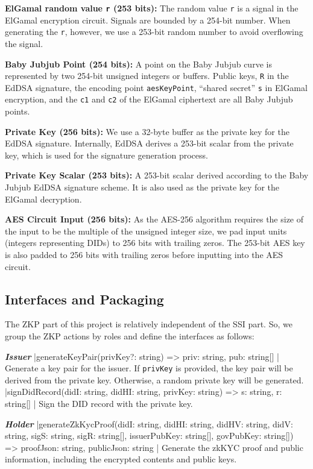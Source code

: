 \documentclass[
]{report}
\begin{document}
\textbf{ElGamal random value \texttt{r} (253 bits):} The random
value \texttt{r} is a signal in the ElGamal encryption circuit. Signals
are bounded by a 254-bit number. When generating the \texttt{r},
however, we use a 253-bit random number to avoid overflowing the signal.

\textbf{Baby Jubjub Point (254 bits):} A point on the Baby Jubjub
curve is represented by two 254-bit unsigned integers or buffers. Public
keys, \texttt{R} in the EdDSA signature, the encoding point
\texttt{aesKeyPoint}, ``shared secret'' \texttt{s} in ElGamal
encryption, and the \texttt{c1} and \texttt{c2} of the ElGamal
ciphertext are all Baby Jubjub points.

\textbf{Private Key (256 bits):} We use a 32-byte buffer as the
private key for the EdDSA signature. Internally, EdDSA derives a 253-bit
scalar from the private key, which is used for the signature generation
process.

\textbf{Private Key Scalar (253 bits):} A 253-bit scalar derived
according to the Baby Jubjub EdDSA signature scheme. It is also used as
the private key for the ElGamal decryption.

\textbf{AES Circuit Input (256 bits):} As the AES-256 algorithm
requires the size of the input to be the multiple of the unsigned
integer size, we pad input units (integers representing DIDs) to 256
bits with trailing zeros. The 253-bit AES key is also padded to 256 bits
with trailing zeros before inputting into the AES circuit.

\subsection{Interfaces and Packaging}

The ZKP part of this project is relatively independent of the SSI part.
So, we group the ZKP actions by roles and define the interfaces as
follows:

\textit{\textbf{Issuer}}
|generateKeyPair(privKey?: string) => { priv: string, pub: string[] }|
Generate a key pair for the issuer. If \texttt{privKey} is provided,
the key pair will be derived from the private key. Otherwise, a random
private key will be generated.
|signDidRecord(didI: string, didHI: string, privKey: string) => { s: string, r: string[] }|
Sign the DID record with the private key.

\textit{\textbf{Holder}}
|generateZkKycProof(didI: string, didHI: string, didHV: string, didV: string, sigS: string, sigR: string[], issuerPubKey: string{[}{]}, govPubKey: string{[}{]}) => { proofJson: string, publicJson: string }|
Generate the zkKYC proof and public information, including the
encrypted contents and public keys.
\end{document}

